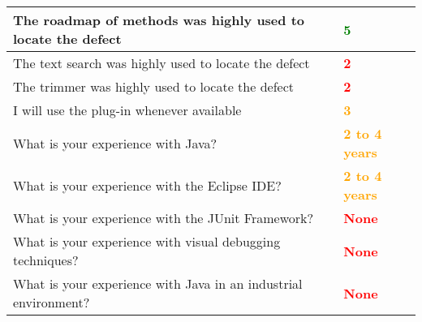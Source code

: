 \begin{table}
\begin{tabular}{m{11cm} | l}
    The roadmap of methods was highly used to locate the defect &
    \textbf{\textcolor{green}{5}} \\ \hline The text search was highly used to locate the defect & \textbf{\textcolor{red}{2}} \\ \hline
    The trimmer was highly used to locate the defect & \textbf{\textcolor{red}{2}} \\ \hline
    I will use the plug-in whenever available & \textbf{\textcolor{orange}{3}} \\ \hline
    What is your experience with Java? & \textbf{\textcolor{orange}{2 to 4 years}} \\ \hline
    What is your experience with the Eclipse IDE? & \textbf{\textcolor{orange}{2 to 4 years}} \\ \hline
    What is your experience with the JUnit Framework? & \textbf{\textcolor{red}{None}} \\ \hline
    What is your experience with visual debugging techniques? & \textbf{\textcolor{red}{None}} \\ \hline
    What is your experience with Java in an industrial environment? & \textbf{\textcolor{red}{None}} \\
    \hline
\end{tabular}
\label{tab:experiment_2_answers}
\end{table}

